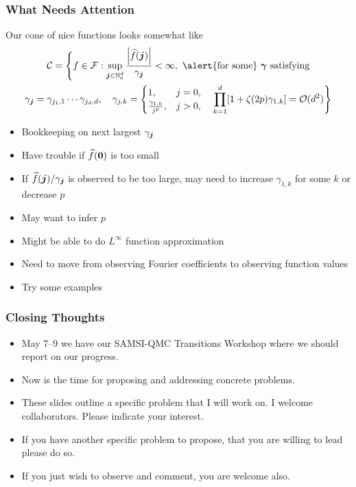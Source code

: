 \documentclass[11pt,compress,xcolor={usenames,dvipsnames},aspectratio=169]{beamer}
\begin{document}
\begin{frame}
\frametitle{What Needs Attention}
\vspace{-3ex}
Our cone of nice functions looks somewhat like
\begin{multline*}
\cc
= \Biggl \{f \in \cf : \sup_{\vj \in \natzero^d} \frac{\abs{\hf(\vj)}}{\gamma_{\vj}} < \infty,  \text{ \alert{for some} } \vgamma \text{ satisfying}\\
\gamma_{\vj} = \gamma_{j_1,1} \cdots \gamma_{j_d,d},  \quad \gamma_{j,k} = \begin{cases}
1, & j = 0, \\
\frac{\gamma_{1,k}}{j^{p}}, & j > 0,
\end{cases}
\quad 
\prod_{k=1}^d [1 + \zeta(2p) \gamma_{1,k}] = \Order(d^2) \Biggr \} 
\end{multline*}
\vspace{-3ex}
\begin{itemize}
	\item Bookkeeping on next largest $\gamma_{\boldsymbol{j}}$
	\item Have trouble if $\widehat{f}(\boldsymbol{0})$ is too small
	\item If $\widehat{f}(\boldsymbol{j})/\gamma_{\boldsymbol{j}}$ is observed to be too large, may need to increase $\gamma_{1,k}$ for some $k$ or decrease $p$
	\item May want to infer $p$
	\item Might be able to do $L^\infty$ function approximation
	\item Need to move from observing Fourier coefficients to observing function values
	\item Try some examples
\end{itemize}


\end{frame}


\begin{frame}
\frametitle{Closing Thoughts}

\begin{itemize}
	\item \alert{May 7--9} we have our SAMSI-QMC Transitions Workshop where we should report on our progress.
	
	\item Now is the time for proposing and addressing \alert{concrete problems}.
	
	\item These slides outline a specific problem that \alert{I will work on}.  I \alert{welcome} collaborators.  Please indicate your interest.
	
	\item If you have another specific problem to propose, that you are willing to lead \alert{please do so.}
	
	\item If you just wish to observe and comment, you are welcome also.
\end{itemize}
\end{frame}


\thankyouframe

\printbibliography
\end{document}
